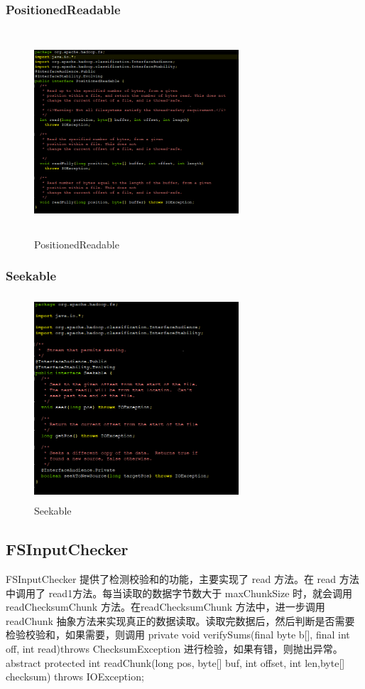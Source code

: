 	\subsubsection{PositionedReadable}
	\begin{figure}
		\centering
		\includegraphics[width=3in,height=3in]{UML/inputstream/PositionedReadable.png}
		\caption{PositionedReadable}
		\label{fig:graph5}
	\end{figure}
	
	
	 \subsubsection{Seekable}

	\begin{figure}
		\centering
		\includegraphics[width=3in,height=3in]{UML/inputstream/Seekable.png}
		\caption{Seekable}
		\label{fig:graph6}
	\end{figure}
	
	\subsection{FSInputChecker}
	FSInputChecker 提供了检测校验和的功能，主要实现了 read 方法。在 read 方法中调用了 read1方法。每当读取的数据字节数大于 maxChunkSize 时，就会调用 readChecksumChunk 方法。在readChecksumChunk 方法中，进一步调用 readChunk 抽象方法来实现真正的数据读取。读取完数据后，然后判断是否需要检验校验和，如果需要，则调用 private void verifySums(final byte b[], final int off, int read)throws ChecksumException 进行检验，如果有错，则抛出异常。abstract protected int readChunk(long pos, byte[] buf, int offset, int len,byte[] checksum) throws IOException;
	
